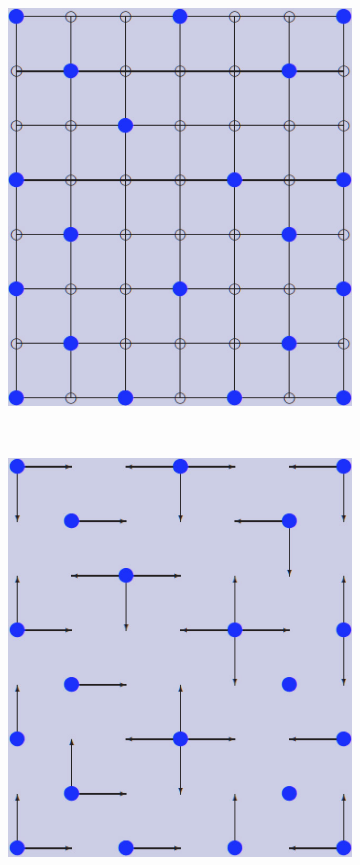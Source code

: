 \documentclass[12pt]{article}
\begin{document}
\begin{figure}[tb]
\begin{subfigure}[b]{0.2\textwidth}
      \caption{}\label{fig:contract_kernel2}
  \end{subfigure}
  ~
  \begin{subfigure}[b]{0.2\textwidth}
      \includegraphics[width=\textwidth]{img/contract_kernel3}
      \caption{}\label{fig:contract_kernel3}
  \end{subfigure}
  ~
  \begin{subfigure}[b]{0.2\textwidth}
      \includegraphics[width=\textwidth]{img/contract_kernel4}

\end{subfigure}
\end{figure}
\end{document}
